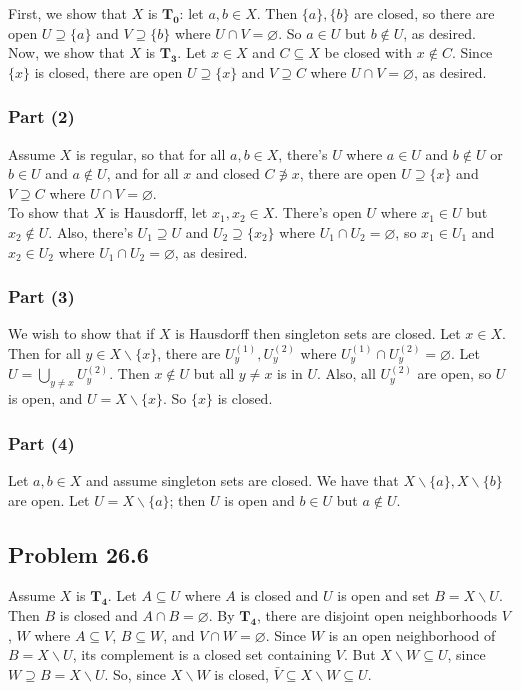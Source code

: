 \documentclass{article}
\newcommand{\nullset}{\varnothing}
\newcommand{\minus}{\backslash}
\begin{document}
First, we show that $X$ is $\mathbf{T_0}$: let $a, b \in X$. Then $\{a\}, \{b\}$ are closed, so there are open $U \supseteq \{a\}$ and $V \supseteq \{b\}$ where $U \cap V = \nullset$. So $a \in U$ but $b \not\in U$, as desired. \\

Now, we show that $X$ is $\mathbf{T_3}$. Let $x \in X$ and $C \subseteq X$ be closed with $x \not\in C$. Since $\{x\}$ is closed, there are open $U \supseteq \{x\}$ and $V \supseteq C$ where $U \cap V = \nullset$, as desired.

\subsubsection*{Part (2)}
Assume $X$ is regular, so that for all $a, b \in X$, there's $U$ where $a \in U$ and $b \not \in U$ or $b \in U$ and $a \not \in U$, and for all $x$ and closed $C \not\ni x$, there are open $U \supseteq \{x\}$ and $V \supseteq C$ where $U \cap V = \nullset$. \\

To show that $X$ is Hausdorff, let $x_1, x_2 \in X$. There's open $U$ where $x_1 \in U$ but $x_2 \not\in U$. Also, there's $U_1 \supseteq U$ and $U_2 \supseteq \{x_2\}$ where $U_1 \cap U_2 = \nullset$, so $x_1 \in U_1$ and $x_2 \in U_2$ where $U_1 \cap U_2 = \nullset$, as desired.

\subsubsection*{Part (3)}
We wish to show that if $X$ is Hausdorff then singleton sets are closed. Let $x \in X$. Then for all $y \in X \minus \{x\}$, there are $U^{(1)}_y, U^{(2)}_y$ where $U^{(1)}_y \cap U^{(2)}_y = \nullset$. Let $U = \bigcup_{y \neq x} U^{(2)}_y$. Then $x \not\in U$ but all $y \neq x$ is in $U$. Also, all $U^{(2)}_y$ are open, so $U$ is open, and $U = X \minus \{x\}$. So $\{x\}$ is closed.

\subsubsection*{Part (4)}
Let $a, b \in X$ and assume singleton sets are closed. We have that $X \minus \{a\}, X \minus \{b\}$ are open. Let $U = X \minus \{a\}$; then $U$ is open and $b \in U$ but $a \not\in U$.

\subsection*{Problem 26.6}
Assume $X$ is $\mathbf{T_4}$. Let $A \subseteq U$ where $A$ is closed and $U$ is open and set $B = X \minus U$. Then $B$ is closed and $A \cap B = \nullset$. By $\mathbf{T_4}$, there are disjoint open neighborhoods $V$, $W$ where $A \subseteq V$, $B \subseteq W$, and $V \cap W = \nullset$. Since $W$ is an open neighborhood of $B = X \minus U$, its complement is a closed set containing $V$. But $X \minus W \subseteq U$, since $W \supseteq B = X \minus U$. So, since $X \minus W$ is closed, $\bar{V} \subseteq X \minus W \subseteq U$. \\
\end{document}
